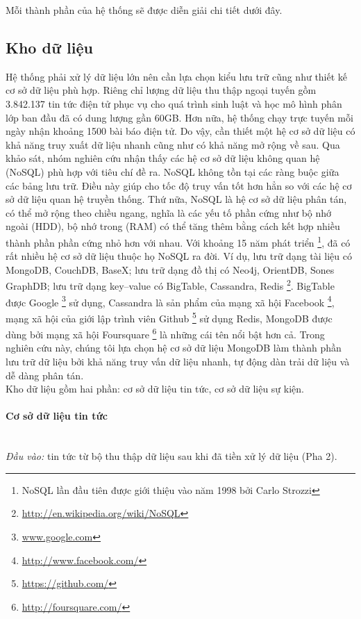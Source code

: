 \noindent Mỗi thành phần của hệ thống sẽ được diễn giải chi tiết dưới đây.

\subsection{Kho dữ liệu}
\label{db}
\noindent Hệ thống phải xử lý dữ liệu lớn nên cần lựa chọn kiểu lưu trữ cũng như thiết kế cơ sở dữ liệu phù hợp. Riêng chỉ lượng dữ liệu thu thập ngoại tuyến gồm 3.842.137 tin tức điện tử phục vụ cho quá trình sinh luật và học mô hình phân lớp ban đầu đã có dung lượng gần 60GB. Hơn nữa, hệ thống chạy trực tuyến mỗi ngày nhận khoảng 1500 bài báo điện tử. Do vậy, cần thiết một hệ cơ sở dữ liệu có khả năng truy xuất dữ liệu nhanh cũng như có khả năng mở rộng về sau. Qua khảo sát, nhóm nghiên cứu nhận thấy các hệ cơ sở dữ liệu không quan hệ (NoSQL) phù hợp với tiêu chí đề ra. NoSQL không tồn tại các ràng buộc giữa các bảng lưu trữ. Điều này giúp cho tốc độ truy vấn tốt hơn hẳn so với các hệ cơ sở dữ liệu quan hệ truyền thống. Thứ nữa, NoSQL là hệ cơ sở dữ liệu phân tán, có thể mở rộng theo chiều ngang, nghĩa là các yếu tố phần cứng như bộ nhớ ngoài (HDD), bộ nhớ trong (RAM) có thể tăng thêm bằng cách kết hợp nhiều thành phần phần cứng nhỏ hơn với nhau. Với khoảng 15 năm phát triển \footnote{NoSQL lần đầu tiên được giới thiệu vào năm 1998 bởi Carlo Strozzi}, đã có rất nhiều hệ cơ sở dữ liệu thuộc họ NoSQL ra đời. Ví dụ, lưu trữ dạng tài liệu có MongoDB, CouchDB, BaseX; lưu trữ dạng đồ thị có Neo4j, OrientDB, Sones GraphDB; lưu trữ dạng key--value có BigTable, Cassandra, Redis \footnote{\href{http://http://en.wikipedia.org/wiki/NoSQL}{http://en.wikipedia.org/wiki/NoSQL}}. BigTable được Google \footnote{\href{www.google.com}{www.google.com}} sử dụng, Cassandra là sản phẩm của mạng xã hội Facebook \footnote{\href{http://www.facebook.com/}{http://www.facebook.com/}}, mạng xã hội của giới lập trình viên Github \footnote{\href{http://github.com/}{https://github.com/}} sử dụng Redis, MongoDB được dùng bởi mạng xã hội Foursquare \footnote{\href{http://foursquare.com/}{http://foursquare.com/}} là những cái tên nổi bật hơn cả.  Trong nghiên cứu này, chúng tôi lựa chọn hệ cơ sở dữ liệu MongoDB làm thành phần lưu trữ dữ liệu bởi khả năng truy vấn dữ liệu nhanh, tự động dàn trải dữ liệu và dễ dàng phân tán.
\\
\noindent Kho dữ liệu gồm hai phần: cơ sở dữ liệu tin tức, cơ sở dữ liệu sự kiện.
\paragraph{Cơ sở dữ liệu tin tức} $\;$ \\
\emph{Đầu vào:} tin tức từ bộ thu thập dữ liệu sau khi đã tiền xử lý dữ liệu (Pha 2).

